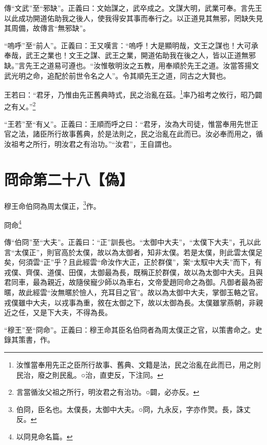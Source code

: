 {\noindent\zhuan{}\fzbyks 傳“文武”至“邪缺”。正義曰：文始謀之，武卒成之。文謀大明，武業可奉。言先王以此成功開道佑助我之後人，使我得安其事而奉行之。以正道見其無邪，罔缺失見其周備，故傳言“無邪缺”。 \par}

{\noindent\shu{}\fzkt “嗚呼”至“前人”。正義曰：王又嘆言：“嗚呼！大是顯明哉，文王之謀也！大可承奉哉，武王之業也！文王之謀、武王之業，開道佑助我在後之人，皆以正道無邪缺。”言先王之道易可遵也。“汝惟敬明汝之五教，用奉順於先王之道。汝當答揚文武光明之命，追配於前世令名之人”。令其順先王之道，同古之大賢也。 \par}

王若曰：“君牙，乃惟由先正舊典時式，民之治亂在茲。\footnote{汝惟當奉用先正之臣所行故事、舊典、文籍是法，民之治亂在此而已，用之則民治，廢之則民亂。○治，直吏反，下注同。}率乃祖考之攸行，昭乃闢之有乂。”\footnote{言當循汝父祖之所行，明汝君之有治功。○闢，必亦反。}

{\noindent\shu{}\fzkt “王若”至“有乂”。正義曰：王順而呼之曰：“君牙，汝為大司徒，惟當奉用先世正官之法，諸臣所行故事舊典，於是法則之，民之治亂在此而已。汝必奉而用之，循汝祖考之所行，明汝君之有治功。”“汝君”，王自謂也。 \par}

\section{冏命第二十八【偽】}


穆王命伯冏為周太僕正，\footnote{伯冏，臣名也。太僕長，太御中大夫。○冏，九永反，字亦作煛。長，誅丈反。}作。

冏命\footnote{以冏見命名篇。}


{\noindent\zhuan{}\fzbyks 傳“伯冏”至“大夫”。正義曰：“正”訓長也。“太御中大夫”，“太僕下大夫”，孔以此言“太僕正”，則官高於太僕，故以為太御者，知非太僕。若是太僕，則此雲太僕足矣，何須雲“正”乎？且此經雲“命汝作大正，正於群僕”，案“太馭中大夫”而下，有戎僕、齊僕、道僕、田僕，太御最為長，既稱正於群僕，故以為太御中大夫。且與君同車，最為親近，故隨侯寵少師以為車右，文帝愛趙同命之為御。凡御者最為密暱，故此經雲“汝無暱於憸人，充耳目之官”。故以為太御中大夫，掌御玉輅之官。戎僕雖中大夫，以戎事為重，敘在太御之下，故以太御為長。太僕雖掌燕朝，非親近之任，又是下大夫，不得為長。 \par}

{\noindent\shu{}\fzkt “穆王”至“冏命”。正義曰：穆王命其臣名伯冏者為周太僕正之官，以策書命之。史錄其策書，作。 \par}

